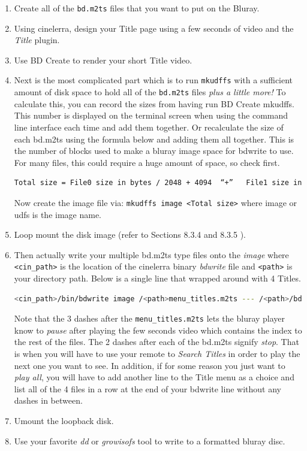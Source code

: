 \begin{enumerate}
    \item Create all of the \texttt{bd.m2ts} files that you want to put on the Bluray.
    \item Using cinelerra, design your Title page using a few seconds of video and the \textit{Title} plugin.
    \item Use BD Create to render your short Title video.
    \item Next is the most complicated part which is to run \texttt{mkudffs} with a sufficient amount of disk space to hold all of the \texttt{bd.m2ts} files \textit{plus a little more!}  To calculate this, you can record the sizes from having run BD Create mkudffs.  This number is displayed on the terminal screen when using the command line interface each time and add them together.  Or recalculate the size of each bd.m2ts using the formula below and adding them all together.  This is the number of blocks used to make a bluray image space for bdwrite to use.  For many files, this could require a huge amount of space, so check first.
    \begin{lstlisting}[language=bash]
    Total size = File0 size in bytes / 2048 + 4094  “+”   File1 size in bytes / 2048 + 4094  “+” ...
    \end{lstlisting}
    Now create the image file via:   \texttt{mkudffs image <Total size>}  where image or udfs is the image name.
    \item Loop mount the disk image (refer to Sections 8.3.4 and 8.3.5 ).
    \item Then actually write your multiple bd.m2ts type files onto the \textit{image} where \texttt{<cin\_path>} is the location of the cinelerra binary \textit{bdwrite} file and \texttt{<path>} is your directory path.  Below is a single line that wrapped around with 4 Titles.
    \begin{lstlisting}[language=bash]
    <cin_path>/bin/bdwrite image /<path>menu_titles.m2ts --- /<path>/bd1.m2ts -- /<path>/bd2.m2ts -- /<path>/bd3.m2ts -- /<path>bd4.m2ts
    \end{lstlisting}
    Note that the 3 dashes after the \texttt{menu\_titles.m2ts} lets the bluray player know to \textit{pause} after playing the few seconds video which contains the index to the rest of the files.  The 2 dashes after each of the bd.m2ts signify \textit{stop}.  That is when you will have to use your remote to \textit{Search Titles} in order to play the next one you want to see.  In addition, if for some reason you just want to \textit{play all}, you will have to add another line to the Title menu as a choice and list all of the 4 files in a row at the end of your bdwrite line without any dashes in between.
    \item Umount the loopback disk.
    \item Use your favorite \textit{dd} or \textit{growisofs} tool to write to a formatted bluray disc.
\end{enumerate}

